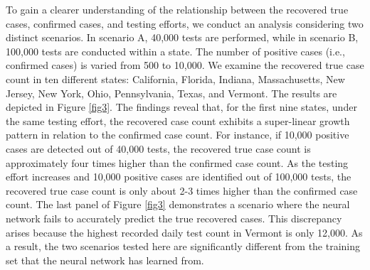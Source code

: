 \documentclass[sn-mathphys,Numbered]{sn-jnl}
\begin{document}
To gain a clearer understanding of the relationship between the recovered true cases, confirmed cases, and testing efforts, we conduct an analysis considering two distinct scenarios. In scenario A, 40,000 tests are performed, while in scenario B, 100,000 tests are conducted within a state. The number of positive cases (i.e., confirmed cases) is varied from 500 to 10,000. We examine the recovered true case count in ten different states: California, Florida, Indiana, Massachusetts, New Jersey, New York, Ohio, Pennsylvania, Texas, and Vermont. The results are depicted in Figure \ref{fig3}. 
The findings reveal that, for the first nine states, under the same testing effort, the recovered case count exhibits a super-linear growth pattern in relation to the confirmed case count. For instance, if 10,000 positive cases are detected out of 40,000 tests, the recovered true case count is approximately four times higher than the confirmed case count. As the testing effort increases and 10,000 positive cases are identified out of 100,000 tests, the recovered true case count is only about 2-3 times higher than the confirmed case count. 
The last panel of Figure \ref{fig3} demonstrates a scenario where the neural network fails to accurately predict the true recovered cases. This discrepancy arises because the highest recorded daily test count in Vermont is only 12,000. As a result, the two scenarios tested here are significantly different from the training set that the neural network has learned from.

\end{document}
